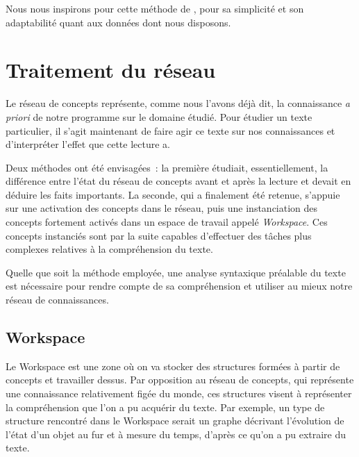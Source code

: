 \documentclass[a4paper, 12pt]{article}
\begin{document}
Nous nous inspirons pour cette méthode de \cite{Mitkov:1998:RPR:980691.980712}, pour sa simplicité et son adaptabilité quant aux données dont nous disposons.





\section{Traitement du réseau}\label{Section:Traitement}

Le réseau de concepts représente, comme nous l'avons déjà dit, la connaissance \textit{a priori} de notre programme sur le domaine étudié. Pour étudier un texte particulier, il s'agit maintenant de faire agir ce texte sur nos connaissances et d'interpréter l'effet que cette lecture a.

Deux méthodes ont été envisagées~: la première étudiait, essentiellement, la différence entre l'état du réseau de concepts avant et après la lecture et devait en déduire les faits importants. La seconde, qui a finalement été retenue, s'appuie sur une activation des concepts dans le réseau, puis une instanciation des concepts fortement activés dans un espace de travail appelé \textit{Workspace}. Ces concepts instanciés sont par la suite capables d'effectuer des tâches plus complexes relatives à la compréhension du texte.

Quelle que soit la méthode employée, une analyse syntaxique préalable du texte est nécessaire pour rendre compte de sa compréhension et utiliser au mieux notre réseau de connaissances.

\subsection{Workspace}
Le Workspace est une zone où on va stocker des structures formées à partir de concepts et travailler dessus. Par opposition au réseau de concepts, qui représente une connaissance relativement figée du monde, ces structures visent à représenter la compréhension que l'on a pu acquérir du texte.
Par exemple, un type de structure rencontré dans le Workspace serait un graphe décrivant l'évolution de l'état d'un objet au fur et à mesure du temps, d'après ce qu'on a pu extraire du texte.
\end{document}
